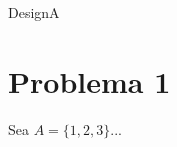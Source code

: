 \begin{assignment}{DesignA}

\duedate{}
\useDesignAactivate
\subtitle{Formativa 1: Relaciones y Órdenes}

\section*{Problema 1}
Sea \( A = \{1, 2, 3\} \)...



\end{assignment}
